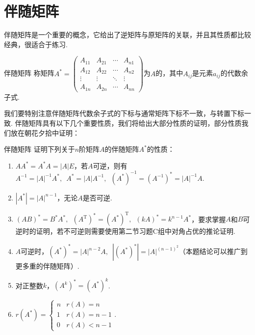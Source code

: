 \section{伴随矩阵}

伴随矩阵是一个重要的概念，它给出了逆矩阵与原矩阵的关联，并且其性质都比较经典，很适合于练习.
\begin{definition}{伴随矩阵}{} 
    称矩阵$A^*=\begin{pmatrix}
            A_{11} & A_{21} & \cdots & A_{n1} \\
            A_{12} & A_{22} & \cdots & A_{n2} \\
            \vdots & \vdots & \ddots & \vdots \\
            A_{1n} & A_{2n} & \cdots & A_{nn}
        \end{pmatrix}$为$A$的，其中$A_{ij}$是元素$a_{ij}$的代数余子式.
\end{definition}
我们要特别注意伴随矩阵代数余子式的下标与通常矩阵下标不一致，与转置下标一致. 伴随矩阵具有以下几个重要性质，我们将给出大部分性质的证明，部分性质我们放在朝花夕拾中证明：
\begin{example}{}{伴随矩阵}
    证明下列关于$n$阶矩阵$A$的伴随矩阵$A^*$的性质：
    \begin{enumerate}
        \item \label{item:13:伴随矩阵:1}
              $AA^*=A^*A=|A|E$，若$A$可逆，则有$A^{-1}=|A|^{-1}A^*,\enspace A^*=|A|A^{-1},\enspace (A^*)^{-1}=(A^{-1})^*=|A|^{-1}A$.

        \item $|A^*|=|A|^{n-1}$，无论$A$是否可逆.

        \item \label{item:13:伴随矩阵:3}
              $(AB)^*=B^*A^*,\enspace (A^\mathrm{T})^*=(A^*)^\mathrm{T},\enspace (kA)^*=k^{n-1}A^*$，要求掌握$A$和$B$可逆时的证明，若不可逆则需要使用第二节习题C组中对角占优的推论证明.

        \item $A$可逆时，$(A^*)^*=|A|^{n-2}A,\enspace |(A^*)^*|=|A|^{(n-1)^2}$（本题结论可以推广到更多重的伴随矩阵）.

        \item 对正整数$k$，$(A^k)^*=(A^*)^k$.

        \item $r(A^*)=\begin{cases}
                      n & r(A)=n     \\
                      1 & r(A)=n-1   \\
                      0 & r(A) < n-1
                  \end{cases}$.
    \end{enumerate}
\end{example}

